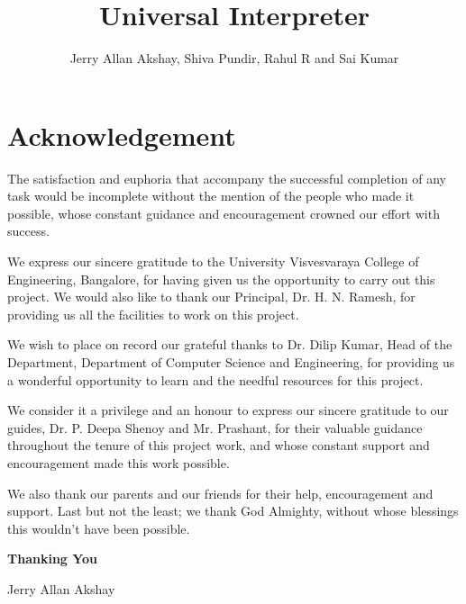 \documentclass[14pt]{report}
\title{Universal Interpreter}
\author{Jerry Allan Akshay, Shiva Pundir, Rahul R and Sai Kumar}
\begin{document}


 	\maketitle

	\newpage


	\chapter*{Acknowledgement}\label{chapter}
		

		The satisfaction and euphoria that accompany the successful completion of any task would be incomplete without the mention of the people who made it possible, whose constant guidance and encouragement crowned our effort with success. \newline
		 
		We express our sincere gratitude to the University Visvesvaraya College of Engineering, Bangalore, for having given us the opportunity to carry out this project. We would also like to thank our Principal, Dr. H. N. Ramesh, for providing us all the facilities to work on this project. \newline
	 
		We wish to place on record our grateful thanks to Dr. Dilip Kumar, Head of the Department, Department of Computer Science and Engineering, for providing us a wonderful opportunity to learn and the needful resources for this project. \newline 
	 
		We consider it a privilege and an honour to express our sincere gratitude to our guides, Dr. P. Deepa Shenoy and Mr. Prashant, for their valuable guidance throughout the tenure of this project work, and whose constant support and encouragement made this work possible.  \newline
	 
		We also thank our parents and our friends for their help, encouragement and support. Last but not the least; we thank God Almighty, without whose blessings this wouldn't have been possible. \newline 

		\hfill \textbf{Thanking You} 

		\hfill Jerry Allan Akshay 
\end{document}
